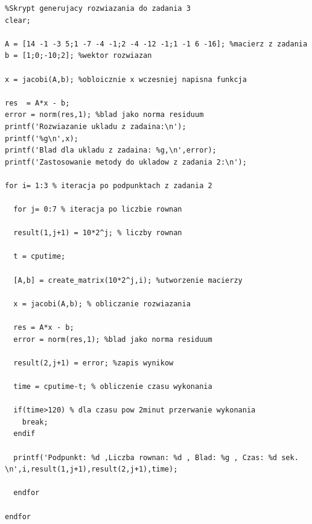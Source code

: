 \documentclass[a4paper, 11pt]{article}
\begin{document}
\begin{lstlisting}
%Skrypt generujacy rozwiazania do zadania 3
clear; 

A = [14 -1 -3 5;1 -7 -4 -1;2 -4 -12 -1;1 -1 6 -16]; %macierz z zadania
b = [1;0;-10;2]; %wektor rozwiazan

x = jacobi(A,b); %obloicznie x wczesniej napisna funkcja

res  = A*x - b; 
error = norm(res,1); %blad jako norma residuum
printf('Rozwiazanie ukladu z zadaina:\n');
printf('%g\n',x);
printf('Blad dla ukladu z zadaina: %g,\n',error); 
printf('Zastosowanie metody do ukladow z zadania 2:\n'); 

for i= 1:3 % iteracja po podpunktach z zadania 2

  for j= 0:7 % iteracja po liczbie rownan
  
  result(1,j+1) = 10*2^j; % liczby rownan
  
  t = cputime; 

  [A,b] = create_matrix(10*2^j,i); %utworzenie macierzy
  
  x = jacobi(A,b); % obliczanie rozwiazania
  
  res = A*x - b;
  error = norm(res,1); %blad jako norma residuum
  
  result(2,j+1) = error; %zapis wynikow
    
  time = cputime-t; % obliczenie czasu wykonania
  
  if(time>120) % dla czasu pow 2minut przerwanie wykonania
    break; 
  endif
  
  printf('Podpunkt: %d ,Liczba rownan: %d , Blad: %g , Czas: %d sek. \n',i,result(1,j+1),result(2,j+1),time);

  endfor
  
endfor

\end{lstlisting}
\end{document}
